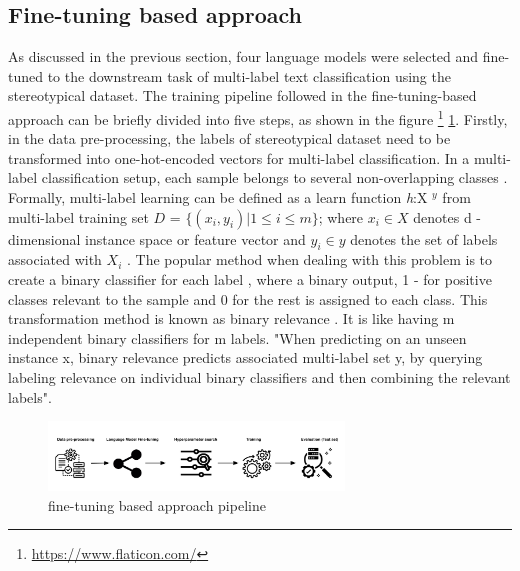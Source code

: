 \subsection{Fine-tuning based approach}
As discussed in the previous section, four language models were selected and fine-tuned to the downstream task of multi-label text classification using the stereotypical dataset. The training pipeline followed in the fine-tuning-based approach can be briefly divided into five steps, as shown in the figure \footnote{\url{https://www.flaticon.com/}} \ref{fig:fine-tuning based approach}. Firstly, in the data pre-processing, the labels of stereotypical dataset need to be transformed into one-hot-encoded vectors for multi-label classification. In a multi-label classification setup, each sample belongs to several non-overlapping classes \cite{sokolova2009systematic}. Formally, multi-label learning can be defined as a learn function \textit{h}:X $^y$ from multi-label training set $D$ = $\{(x_i,y_i)| 1 \leq i\leq m\}$; where  $x_i \in X$ denotes d - dimensional instance space or feature vector and $y_i \in y$ denotes the  set of labels associated with $X_i$ \cite{zhang2013review}. The popular method when dealing with this problem is to create a binary classifier for each label \cite{ji2008extracting}, where a binary output, 1 - for positive classes relevant to the sample and 0 for the rest is assigned to each class. This transformation method is known as binary relevance \cite{zhang2010multi}. 
It is like having m independent binary classifiers for m labels. "When predicting on an unseen instance x, binary relevance predicts associated multi-label set y, by querying labeling relevance on individual binary classifiers and then combining the relevant labels"\cite{zhang2010multi}.  

\begin{figure}[]
    \centering
    \includegraphics[width=0.7\textwidth]{thesis/figures/LM pipeline.png}
    \caption{fine-tuning based approach pipeline}
    \label{fig:fine-tuning based approach}
\end{figure}

